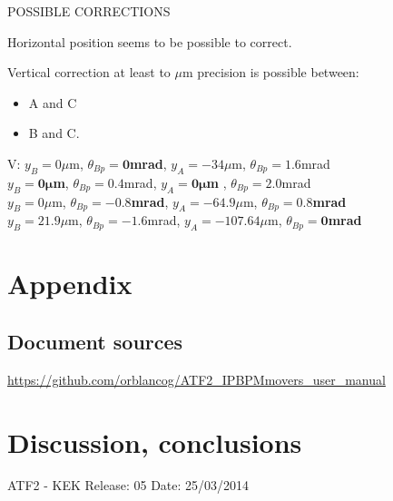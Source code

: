 \documentclass[a4paper,11pt]{book}
\begin{document}
\vspace*{0.5cm}
POSSIBLE CORRECTIONS\\\raggedright
Horizontal position seems to be possible to correct.\par
Vertical correction at least to $\mu$m precision is possible between:
\begin{itemize}
 \item A and C
 \item B and C.
\end{itemize}
V:\hspace*{0.1cm} $y_B=0\mu$m, $\theta_{Bp}=\boldsymbol{0}$\textbf{mrad},\hspace{10mm} $y_A=-34\mu$m, $\theta_{Bp}=1.6$mrad\\
\hspace*{0.45cm} $y_B=\boldsymbol{0\mu}$\textbf{m}, $\theta_{Bp}=0.4$mrad,\hspace{7mm} $y_A=\boldsymbol{0\mu}$\textbf{m	}, $\theta_{Bp}=2.0$mrad\\
\hspace*{0.45cm} $y_B=0\mu$m, $\theta_{Bp}=\boldsymbol{-0.8}$\textbf{mrad},\hspace{3mm} $y_A=-64.9\mu$m, $\theta_{Bp}=\boldsymbol{0.8}$\textbf{mrad}\\
\hspace*{0.45cm} $y_B=21.9\mu$m, $\theta_{Bp}=-1.6$mrad, $y_A=-107.64\mu$m, $\theta_{Bp}=\boldsymbol{0}$\textbf{mrad}\\



\appendix
\chapter{Appendix}
\section{Document sources}
\url{https://github.com/orblancog/ATF2_IPBPMmovers_user_manual}
\backmatter
\chapter{Discussion, conclusions}
ATF2 - KEK
Release: 05
Date: 25/03/2014
\end{document}
